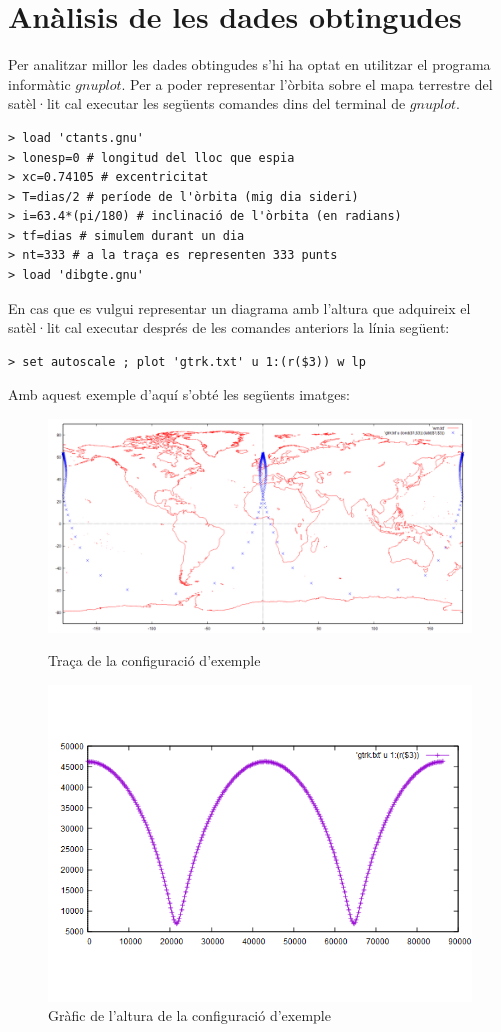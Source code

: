 \documentclass[12pt]{article}
\begin{document}
\section{Anàlisis de les dades obtingudes}
Per analitzar millor les dades obtingudes s'hi ha optat en utilitzar el programa informàtic $gnuplot$. \newline
Per a poder representar l'òrbita sobre el mapa terrestre del satèl·lit cal executar les següents comandes dins del terminal de $gnuplot$.
\begin{verbatim}
> load 'ctants.gnu'
> lonesp=0 # longitud del lloc que espia
> xc=0.74105 # excentricitat
> T=dias/2 # període de l'òrbita (mig dia sideri)
> i=63.4*(pi/180) # inclinació de l'òrbita (en radians)
> tf=dias # simulem durant un dia
> nt=333 # a la traça es representen 333 punts
> load 'dibgte.gnu'
\end{verbatim}
En cas que es vulgui representar un diagrama amb l'altura que adquireix el satèl·lit cal executar després de les comandes anteriors la línia següent:
\begin{verbatim}
> set autoscale ; plot 'gtrk.txt' u 1:(r($3)) w lp
\end{verbatim}
Amb aquest exemple d'aquí s'obté les següents imatges:
\begin{figure}
\centering
\includegraphics[width=1\textwidth]{orbita_principal.png}
\caption{Traça de la configuració d'exemple}
\label{fig:traç-exemp}
\includegraphics[width=1\textwidth]{altitud_principal.png}
\caption{Gràfic de l'altura de la configuració d'exemple}
\label{fig:alti-exemp}
\end{figure}
\end{document}
